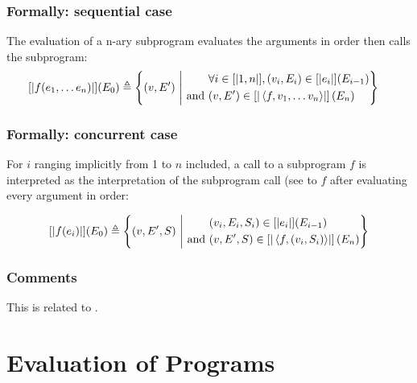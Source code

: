 \documentclass{book}
\newcommand\semantic[1]{\llbracket #1 \rrbracket}
\begin{document}
\begin{formal}
  \subsection{Formally: sequential case}
  The evaluation of a n-ary subprogram evaluates the arguments in order then
  calls the subprogram:
  \begin{align}
  \interp{f (e_1, \dotsc e_n)} (E_0) & \triangleq
    \left\{ (v, E') \st{}
    \begin{aligned}
      & \forall i \in \semantic{ 1, n }, (v_i, E_i) \in \interp{e_i} (E_{i - 1})
      \\ \text{and}\ &
      (v, E') \in \interp{\left\langle f, v_1, \dotsc v_n \right\rangle} \left(E_n\right)
    \end{aligned}
    \right\}
  \label{eq:sem-seq-fcall}
  \end{align}

  \subsection{Formally: concurrent case}
  For $i$ ranging implicitly from 1 to $n$ included, a call to a subprogram $f$
  is interpreted as the interpretation of the subprogram call (see to $f$ after
  evaluating every argument in order:

  \begin{align}
    \interp{f (e_i)} (E_0) \triangleq
      \left\{ (v, E', S) \st{}
      \begin{aligned}
        & %
          (v_i, E_i, S_i) \in \interp{e_i} (E_{i - 1})
        \\ \text{and}\ &
        (v, E', S) \in \interp{\left\langle f, (v_i,S_i) \right\rangle} \left(E_n\right)
      \end{aligned}
      \right\}
    \label{eq:sem-conc-fcall}
  \end{align}
\end{formal}

  \subsection{Comments}
  This is related to .

\chapter{Evaluation of Programs}
\end{document}
